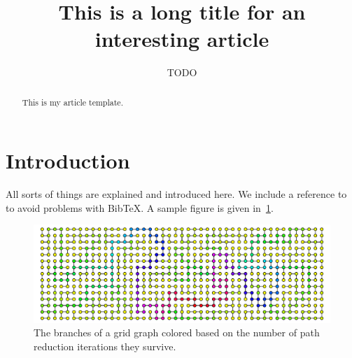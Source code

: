 \documentclass[12pt,reqno]{amsart}
\title[Short title]{This is a long title for an interesting article}
\author[T.~ODO]{TODO}
\theoremstyle{remark}
\theoremstyle{definition}
\begin{document}
\begin{abstract}
This is my article template.
\end{abstract}

\maketitle

\section{Introduction}

All sorts of things are explained and introduced here. We include
a reference to~\cite{Hackl:2018:shape-parameters-trees} to avoid problems
with BibTeX. A sample figure is given in~\ref{fig:grid}.

\begin{figure}[ht]
  \centering
  \includegraphics[width=0.9\linewidth]{gridfun.pdf}
  \caption{The branches of a grid graph colored based on
    the number of path reduction iterations they survive.
  }\label{fig:grid}
\end{figure}



\end{document}

